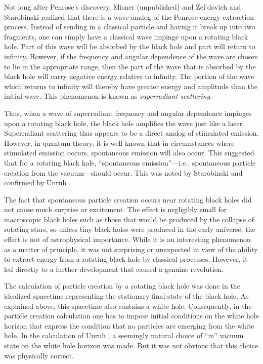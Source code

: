 Not long after Penrose's discovery, Misner (unpublished) and
Zel'dovich and Starobinski \cite{z,s} realized that there is a wave
analog of the Penrose energy extraction process. Instead of sending in
a classical particle and having it break up into two fragments, one
can simply have a classical wave impinge upon a rotating black
hole. Part of this wave will be absorbed by the black hole and part
will return to infinity. However, if the frequency and angular
dependence of the wave are chosen to lie in the appropriate range,
then the part of the wave that is absorbed by the black hole will
carry negative energy relative to infinity. The portion of the wave
which returns to infinity will thereby have greater energy and
amplitude than the initial wave. This phenomenon is known as {\it
superradiant scattering}.

Thus, when a wave of superradiant frequency and angular dependence
impinges upon a rotating black hole, the black hole amplifies the wave
just like a laser. Superradiant scattering thus appears to be a direct
analog of stimulated emission. However, in quantum theory, it is well
known that in circumstances where stimulated emission occurs,
spontaneous emission will also occur. This suggested that for a
rotating black hole, ``spontaneous emission''---i.e., spontaneous
particle creation from the vacuum---should occur. This was noted by
Starobinski \cite{s} and confirmed by Unruh \cite{u1}.

The fact that spontaneous particle creation occurs near rotating black
holes did not cause much surprise or excitement. The effect is
negligibly small for macroscopic black holes such as those that would
be produced by the collapse of rotating stars, so unless tiny black
holes were produced in the early universe, the effect is not of
astrophysical importance. While it is an interesting phenomenon as a
matter of principle, it was not surprising or unexpected in view of
the ability to extract energy from a rotating black hole by classical
processes. However, it led directly to a further development that
caused a genuine revolution.

The calculation of particle creation by a rotating black hole was done
in the idealized spacetime representing the stationary final state of
the black hole. As explained above, this spacetime also contains a white
hole. Consequently, in the particle
creation calculation one has to impose initial conditions on the white
hole horizon that express the condition that no particles are emerging
from the white hole. In the calculation of Unruh \cite{u1}, a seemingly natural
choice of ``in'' vacuum state on the white hole horizon was made. But
it was not obvious that this choice was physically correct.

